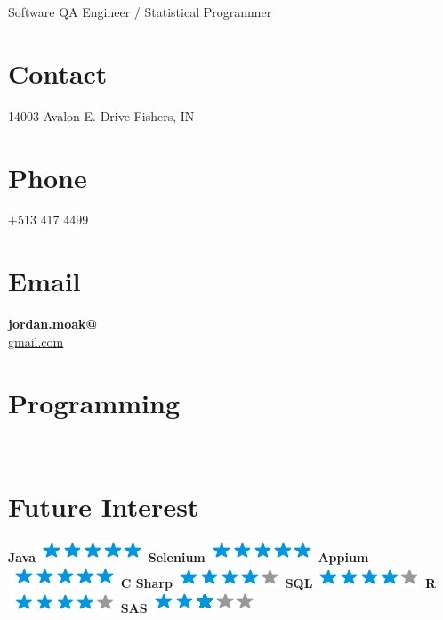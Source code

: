 \documentclass[]{moak-resume}
\begin{document}
      {Software QA Engineer / Statistical Programmer}

\begin{aside}
  \section{Contact}
    14003 Avalon E. Drive
    Fishers, IN
    ~
  \section{Phone}
    +513 417 4499
    ~
  \section{Email}
    \href{mailto:jordan.moak@gmail.com}{\textbf{jordan.moak@}\\gmail.com}
    ~
  \section{Programming}
	\programmingPie{}
    ~
  \section{Future Interest}
    \textbf{Java}\includegraphics[scale=0.40]{img/5stars.png}
    \textbf{Selenium}\includegraphics[scale=0.40]{img/5stars.png}
    \textbf{Appium}\includegraphics[scale=0.40]{img/5stars.png}
    \textbf{C Sharp}\includegraphics[scale=0.40]{img/4stars.png}
    \textbf{SQL}\includegraphics[scale=0.40]{img/4stars.png}
    \textbf{R}\includegraphics[scale=0.40]{img/4stars.png}
    \textbf{SAS}\includegraphics[scale=0.40]{img/3stars.png}
    ~

\end{aside}
\end{document}
